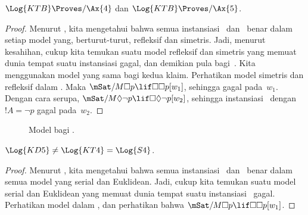 \documentclass[../../../include/open-logic-section]{subfiles}
\begin{document}
\begin{thm}
  $\Log{KTB}\Proves/\Ax{4}$ dan $\Log{KTB}\Proves/\Ax{5}$.
\end{thm}

\begin{proof}
  Menurut , kita mengetahui bahwa semua
  instansiasi~ dan~ benar dalam setiap model yang, berturut-turut,
  refleksif dan simetris. Jadi, menurut kesahihan, cukup kita temukan suatu
  model refleksif dan simetris yang memuat dunia tempat suatu instansiasi
   gagal, dan demikian pula bagi~. Kita menggunakan model yang
  sama bagi kedua klaim. Perhatikan model simetris dan refleksif dalam
  . Maka
  $\mSat/{M}{\Box p\lif\Box\Box p}[w_1]$, sehingga  gagal pada~$w_1$.
  Dengan cara serupa,
  $\mSat/{M}{\Diamond\lnot p\lif\Box\Diamond\lnot p}[w_2]$, sehingga
  instansiasi~ dengan $!A=\lnot p$ gagal pada~$w_2$.
\end{proof}

\begin{figure}[htpb]
  \centering
  \caption{Model bagi .}
\end{figure}

\begin{thm}
  $\Log{KD5}\neq\Log{KT4}=\Log{S4}$.
\end{thm}

\begin{proof}
  Menurut , kita mengetahui bahwa semua
  instansiasi~ dan~ benar dalam semua model yang serial dan
  Euklidean. Jadi, cukup kita temukan suatu model serial dan Euklidean yang
  memuat dunia tempat suatu instansiasi~ gagal. Perhatikan model dalam
  , dan perhatikan bahwa
  $\mSat/{M}{\Box p\lif\Box\Box p}[w_1]$.
\end{proof}
\end{document}
